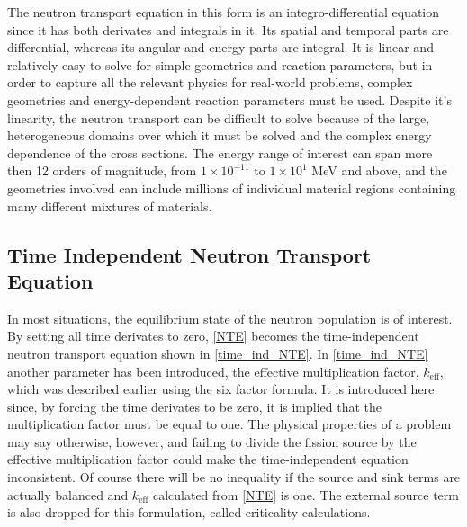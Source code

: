  The neutron transport equation in this form is an integro-differential equation since it has both derivates and integrals in it.  Its spatial and temporal parts are differential, whereas its angular and energy parts are integral.  It is linear and relatively easy to solve for simple geometries and reaction parameters, but in order to capture all the relevant physics for real-world problems, complex geometries and energy-dependent reaction parameters must be used.  Despite it's linearity, the neutron transport can be difficult to solve because of the large, heterogeneous domains over which it must be solved and the complex energy dependence of the cross sections.  
 The energy range of interest can span more then 12 orders of magnitude, from $1\times 10 ^{-11}$ to $1\times 10 ^{1}$ MeV and above, and the geometries involved can include millions of individual material regions containing many different mixtures of materials. 
 
 \subsection{Time Independent Neutron Transport Equation}

In most situations, the equilibrium state of the neutron population is of interest.  By setting all time derivates to zero, \eqref{NTE} becomes the time-independent neutron transport equation shown in \eqref{time_ind_NTE}.  In \eqref{time_ind_NTE} another parameter has been introduced, the effective multiplication factor, $k_\mathrm{eff}$, which was described earlier using the six factor formula.  It is introduced here since, by forcing the time derivates to be zero, it is implied that the multiplication factor must be equal to one.  The physical properties of a problem may say otherwise, however, and failing to divide the fission source by the effective multiplication factor could make the time-independent equation inconsistent.  Of course there will be no inequality if the source and sink terms are actually balanced and $k_\mathrm{eff}$ calculated from \eqref{NTE} is one.  The external source term is also dropped for this formulation, called criticality calculations.

